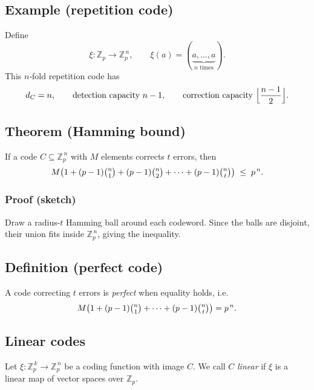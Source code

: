 \documentclass[docmute]{article}
\begin{document}
\subsection*{Example (repetition code)}
Define
\[
  \xi : \mathbb Z_p \longrightarrow \mathbb Z_p^{\,n},
  \qquad
  \xi(a)=(\underbrace{a,\dots,a}_{n\text{ times}}).
\]
This $n$‐fold repetition code has
\[
  d_C=n,\qquad
  \text{detection capacity } n-1,\qquad
  \text{correction capacity }\Bigl\lfloor\frac{n-1}{2}\Bigr\rfloor.
\]

\subsection*{Theorem (Hamming bound)}
If a code $C\subseteq\mathbb Z_p^{\,n}$ with $M$ elements corrects $t$
errors, then
\[
  M\bigl(1 + (p-1)\tbinom{n}{1} + (p-1)\tbinom{n}{2}
        + \cdots + (p-1)\tbinom{n}{t}\bigr)\;\le\;p^{\,n}.
\]

\subsubsection*{Proof (sketch)}
Draw a radius-$t$ Hamming ball around each codeword.  
Since the balls are disjoint, their union fits inside
$\mathbb Z_p^{\,n}$, giving the inequality.

\begin{center}
\end{center}

\subsection*{Definition (perfect code)}
A code correcting $t$ errors is \emph{perfect} when equality holds, i.e.
\[
  M\bigl(1 + (p-1)\tbinom{n}{1} + \cdots + (p-1)\tbinom{n}{t}\bigr)=p^{\,n}.
\]

\subsection*{Linear codes}
Let $\xi : \mathbb Z_p^{\,k} \to \mathbb Z_p^{\,n}$ be a coding function
with image $C$.  
We call $C$ \emph{linear} if $\xi$ is a linear map of vector spaces over
$\mathbb Z_p$.
\end{document}
